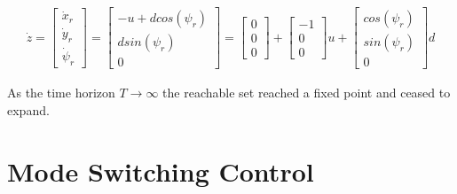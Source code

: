\documentclass[a4paper]{article}
\begin{document}
\begin{align*}
  \dot{z}
  =
  \left[\begin{matrix} \dot{x}_r \\ \dot{y}_r \\ \dot{\psi}_r \end{matrix}\right]
  =
  \left[\begin{matrix} -u + d cos(\psi_r) \\ d sin(\psi_r) \\ 0 \end{matrix}\right]
  =
  \left[ \begin{matrix} 0 \\ 0 \\ 0 \end{matrix}\right] + \left[ \begin{matrix}-1 \\ 0 \\ 0\end{matrix}\right] u +\left[\begin{matrix} cos(\psi_r) \\ sin(\psi_r) \\ 0 \end{matrix}\right] d
\end{align*}

As the time horizon $T \rightarrow \infty$ the reachable set reached a fixed point and ceased to expand.

\section{Mode Switching Control}
\end{document}
